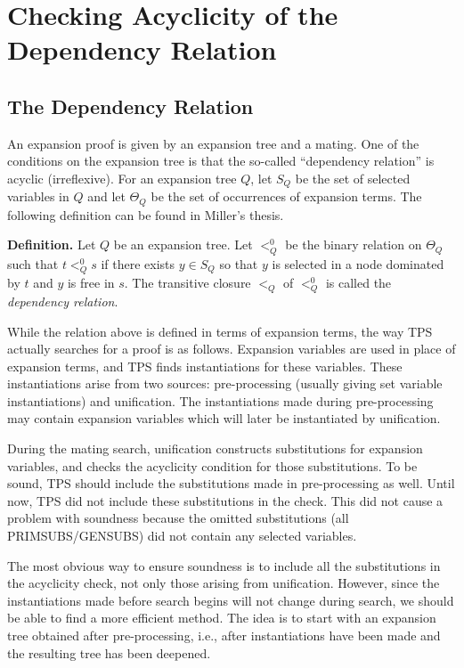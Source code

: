\section{Checking Acyclicity of the Dependency Relation}\label{acyclicity}

\subsection{The Dependency Relation}

An expansion proof is given by an expansion tree and a mating.
One of the conditions on the expansion tree is that the
so-called ``dependency relation'' is acyclic (irreflexive).
For an expansion tree $Q$, let $S_Q$ be the set of selected
variables in $Q$ and let $\Theta_Q$ be the set of occurrences of expansion terms.
The following definition can be found in Miller's thesis.

{\bf Definition.}  Let $Q$ be an expansion tree.  Let $<^0_Q$ be the binary
relation on $\Theta_Q$ such that $t<^0_Q s$ if there exists $y\in S_Q$
so that $y$ is selected in a node dominated by $t$ and $y$ is free in $s$.
The transitive closure
$<_Q$ of $<^0_Q$ is called the {\it dependency relation}.

While the relation above is defined in terms of expansion terms,
the way TPS actually searches for a proof is as follows.
Expansion variables are used in place of expansion terms,
and TPS finds instantiations for these variables.  These
instantiations arise from two sources: pre-processing (usually
giving set variable instantiations)
and unification.  The instantiations made during pre-processing may contain expansion
variables which will later be instantiated by unification.

During the mating search, unification constructs substitutions for
expansion variables, and checks the acyclicity condition for those 
substitutions.  To be sound, TPS should include the substitutions
made in pre-processing as well.  Until now, TPS did not include these
substitutions in the check.  This did not cause a problem with soundness
because the omitted substitutions (all PRIMSUBS/GENSUBS) did not
contain any selected variables.

The most obvious way to ensure soundness is to include all the
substitutions in the acyclicity check, not only those arising from
unification.  However, since the instantiations made before search
begins will not change during search, we should be able to find a more efficient
method.  The idea is to start with an expansion tree obtained after pre-processing, i.e.,
after instantiations have been made and the resulting tree has been deepened.

